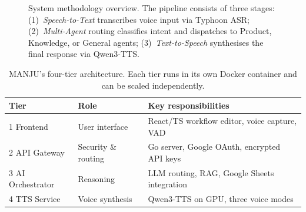 \documentclass[10pt, a4paper, twocolumn]{article}
\begin{document}
\begin{figure}[t]
    \caption{System methodology overview. The pipeline consists of three stages:
    (1)~\textit{Speech-to-Text} transcribes voice input via Typhoon ASR;
    (2)~\textit{Multi-Agent} routing classifies intent and dispatches to
    Product, Knowledge, or General agents;
    (3)~\textit{Text-to-Speech} synthesises the final response via Qwen3-TTS.}
    \label{fig:methodology}
\end{figure}

\begin{table}[h]
    \centering
    \caption{MANJU's four-tier architecture. Each tier runs in its own
             Docker container and can be scaled independently.}
    \label{tab:tiers}
    \small
    \begin{tabular}{@{}lll@{}}
        \toprule
        \textbf{Tier} & \textbf{Role} & \textbf{Key responsibilities} \\
        \midrule
        1 Frontend      & User interface     & React/TS workflow editor, voice capture, VAD \\
        2 API Gateway   & Security \& routing & Go server, Google OAuth, encrypted API keys \\
        3 AI Orchestrator & Reasoning        & LLM routing, RAG, Google Sheets integration \\
        4 TTS Service   & Voice synthesis    & Qwen3-TTS on GPU, three voice modes \\
        \bottomrule
    \end{tabular}
\end{table}
\end{document}
